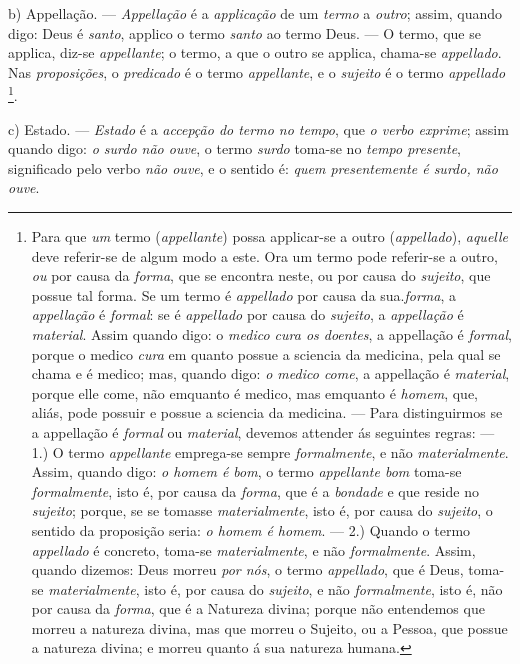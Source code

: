 b) Appellação. --- \emph{Appellação} é a \emph{applicação} de um \emph{termo} a \emph{outro}; assim, quando digo: Deus é \emph{santo}, applico o termo \emph{santo} ao termo Deus. --- O termo, que se applica, diz-se \emph{appellante}; o termo, a que o outro se applica, chama-se \emph{appellado}. Nas \emph{proposições}, o \emph{predicado} é o termo \emph{appellante}, e o \emph{sujeito} é o termo \emph{appellado} \footnote{Para que \emph{um} termo (\emph{appellante}) possa applicar-se a outro (\emph{appellado}), \emph{aquelle} deve referir-se de algum modo a este. Ora um termo pode referir-se a outro, \emph{ou} por causa da \emph{forma}, que se encontra neste, ou por causa do \emph{sujeito}, que possue tal forma. Se um termo é \emph{appellado} por causa da sua.\emph{forma}, a \emph{appellação} é \emph{formal}: se é \emph{appellado} por causa do \emph{sujeito}, a \emph{appellação} é \emph{material}. Assim quando digo: o \emph{medico cura os doentes}, a appellação é \emph{formal}, porque o medico \emph{cura} em quanto possue a sciencia da medicina, pela qual se chama e é medico; mas, quando digo: \emph{o medico come}, a appellação é \emph{material}, porque elle come, não emquanto é medico, mas emquanto é \emph{homem}, que, aliás, pode possuir e possue a sciencia da medicina. --- Para distinguirmos se a appellação é \emph{formal} ou \emph{material}, devemos attender ás seguintes regras: --- 1.) O termo \emph{appellante} emprega-se sempre \emph{formalmente}, e não \emph{materialmente}. Assim, quando digo: \emph{o homem é bom}, o termo \emph{appellante bom} toma-se \emph{formalmente}, isto é, por causa da \emph{forma}, que é a \emph{bondade} e que reside no \emph{sujeito}; porque, se se tomasse \emph{materialmente}, isto é, por causa do \emph{sujeito}, o sentido da proposição seria: \emph{o homem é homem}. --- 2.) Quando o termo \emph{appellado} é concreto, toma-se \emph{materialmente}, e não \emph{formalmente}. Assim, quando dizemos: Deus morreu \emph{por nós}, o termo \emph{appellado}, que é Deus, toma-se \emph{materialmente}, isto é, por causa do \emph{sujeito}, e não \emph{formalmente}, isto é, não por causa da \emph{forma}, que é a Natureza divina; porque não entendemos que morreu a natureza divina, mas que morreu o Sujeito, ou a Pessoa, que possue a natureza divina; e morreu quanto á sua natureza humana.}.

c) Estado. --- \emph{Estado} é a \emph{accepção do termo no tempo}, que \emph{o verbo exprime}; assim quando digo: \emph{o surdo não ouve}, o termo \emph{surdo} toma-se no \emph{tempo presente}, significado pelo verbo \emph{não ouve}, e o sentido é: \emph{quem presentemente é surdo, não ouve}.

